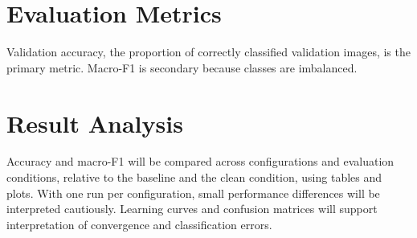 \documentclass[11pt,letterpaper]{article}
\begin{document}
\section*{Evaluation Metrics}
Validation accuracy, the proportion of correctly classified validation images, is the primary metric. Macro-F1 is secondary because classes are imbalanced.

\clearpage

\section*{Result Analysis}
Accuracy and macro-F1 will be compared across configurations and evaluation conditions, relative to the baseline and the clean condition, using tables and plots.
With one run per configuration, small performance differences will be interpreted cautiously.
Learning curves and confusion matrices will support interpretation of convergence and classification errors.



\end{document}
